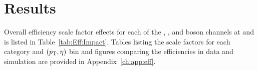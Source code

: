 \section{Results}\label{ch:eff:results}
Overall efficiency scale factor effects for each of the \Wp, \Wm, and \Z boson channels at \sg and \sh is listed in Table~\ref{tab:Eff:Impact}. Tables listing the scale factors for each category and $(p_{\mathrm{T}},\eta)$ bin and figures comparing the efficiencies in data and simulation are provided in Appendix~\ref{ch:app:eff}.



